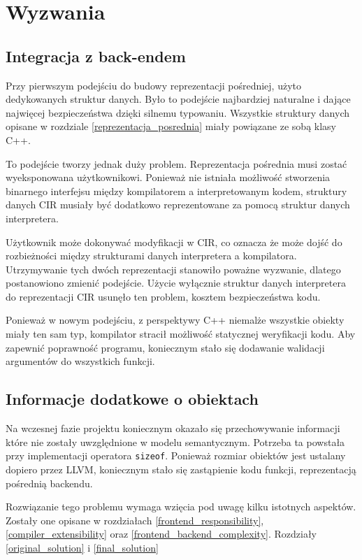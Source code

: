 \section{Wyzwania}
\subsection{Integracja z back-endem}
Przy pierwszym podejściu do budowy reprezentacji pośredniej, użyto dedykowanych struktur danych. Było to podejście najbardziej naturalne i dające najwięcej bezpieczeństwa dzięki silnemu typowaniu. Wszystkie struktury danych opisane w rozdziale \ref{reprezentacja_posrednia} miały powiązane ze sobą klasy C++.


To podejście tworzy jednak duży problem. Reprezentacja pośrednia musi zostać wyeksponowana użytkownikowi. Ponieważ nie istniała możliwość stworzenia binarnego interfejsu między kompilatorem a interpretowanym kodem, struktury danych CIR musiały być dodatkowo reprezentowane za pomocą struktur danych interpretera.


Użytkownik może dokonywać modyfikacji w CIR, co oznacza że może dojść do rozbieżności między strukturami danych interpretera a kompilatora. Utrzymywanie tych dwóch reprezentacji stanowiło poważne wyzwanie, dlatego postanowiono zmienić podejście. Użycie wyłącznie struktur danych interpretera do reprezentacji CIR usunęło ten problem, kosztem bezpieczeństwa kodu.


Ponieważ w nowym podejściu, z perspektywy C++ niemalże wszystkie obiekty miały ten sam typ, kompilator stracił możliwość statycznej weryfikacji kodu.
Aby zapewnić poprawność programu, koniecznym stało się dodawanie walidacji argumentów do wszystkich funkcji.

\subsection{Informacje dodatkowe o obiektach}
Na wczesnej fazie projektu koniecznym okazało się przechowywanie informacji które nie zostały uwzględnione w modelu semantycznym.
Potrzeba ta powstała przy implementacji operatora \texttt{sizeof}.
Ponieważ rozmiar obiektów jest ustalany dopiero przez LLVM, koniecznym stało się zastąpienie kodu funkcji, reprezentacją pośrednią backendu.

Rozwiązanie tego problemu wymaga wzięcia pod uwagę kilku istotnych aspektów.
Zostały one opisane w rozdziałach \ref{frontend_responsibility}, \ref{compiler_extensibility} oraz \ref{frontend_backend_complexity}.
Rozdziały \ref{original_solution} i \ref{final_solution}

